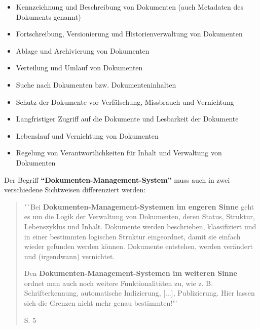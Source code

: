 \begin{itemize}
\item Kennzeichnung und Beschreibung von Dokumenten (auch Metadaten des Dokuments genannt) 
\item Fortschreibung, Versionierung und Historienverwaltung von Dokumenten
\item Ablage und Archivierung von Dokumenten
\item Verteilung und Umlauf von Dokumenten
\item Suche nach Dokumenten bzw. Dokumenteninhalten
\item Schutz der Dokumente vor Verfälschung, Missbrauch und Vernichtung
\item Langfristiger Zugriff auf die Dokumente und Lesbarkeit der Dokumente
\item Lebenslauf und Vernichtung von Dokumenten
\item Regelung von Verantwortlichkeiten für Inhalt und Verwaltung von Dokumenten
\end{itemize}
Der Begriff \textbf{"`Dokumenten-Management-System"'} muss auch in zwei verschiedene Sichtweisen differenziert werden:
\begin{quote}"`Bei \textbf{Dokumenten-Management-Systemen im engeren Sinne} geht es um die Logik der Verwaltung von Dokumenten, deren Status, Struktur, Lebenszyklus und Inhalt. Dokumente werden beschrieben, klassifiziert und in einer bestimmten logischen Struktur eingeordnet, damit sie einfach wieder gefunden werden können. Dokumente entstehen, werden verändert und (irgendwann) vernichtet.

Den \textbf{Dokumenten-Management-Systemen im weiteren Sinne} ordnet man auch noch weitere Funktionalitäten zu, wie z. B. Schrifterkennung, automatische Indizierung, [...], Publizierung. Hier lassen sich die Grenzen nicht mehr genau bestimmten!"' \begin{flushright}\cite{DMS08} S. 5\end{flushright}\end{quote}

